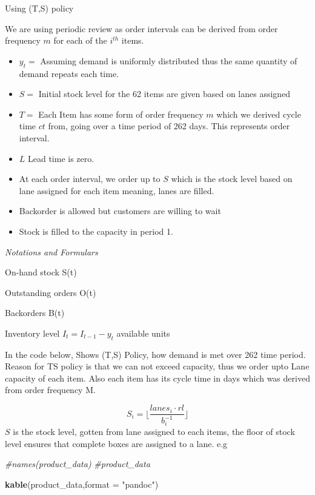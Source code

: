 \documentclass[
]{article}
\newenvironment{Shaded}{\begin{snugshade}}{\end{snugshade}}
\newcommand{\CommentTok}[1]{\textcolor[rgb]{0.56,0.35,0.01}{\textit{#1}}}
\newcommand{\DataTypeTok}[1]{\textcolor[rgb]{0.13,0.29,0.53}{#1}}
\newcommand{\KeywordTok}[1]{\textcolor[rgb]{0.13,0.29,0.53}{\textbf{#1}}}
\newcommand{\NormalTok}[1]{#1}
\newcommand{\StringTok}[1]{\textcolor[rgb]{0.31,0.60,0.02}{#1}}
\begin{document}
Using (T,S) policy

We are using periodic review as order intervals can be derived from
order frequency \(m\) for each of the \(i^{th}\) items.

\begin{itemize}
\item
  \(y_t=\) Assuming demand is uniformly distributed thus the same
  quantity of demand repeats each time.
\item
  \(S=\) Initial stock level for the 62 items are given based on lanes
  assigned
\item
  \(T=\) Each Item has some form of order frequency \(m\) which we
  derived cycle time \(ct\) from, going over a time period of 262 days.
  This represents order interval.
\item
  \(L\) Lead time is zero.
\item
  At each order interval, we order up to \(S\) which is the stock level
  based on lane assigned for each item meaning, lanes are filled.
\item
  Backorder is allowed but customers are willing to wait
\item
  Stock is filled to the capacity in period 1.
\end{itemize}

\emph{Notations and Formulars}

On-hand stock S(t)

Outstanding orders O(t)

Backorders B(t)

Inventory level \(I_t= I_{t-1}-y_t\) available units

In the code below, Shows (T,S) Policy, how demand is met over 262 time
period. Reason for TS policy is that we can not exceed capacity, thus we
order upto Lane capacity of each item. Also each item has its cycle time
in days which was derived from order frequency M.

\[S_i=\bigg \lfloor \frac {lanes_i \cdot rl}{b_i^{-1}} \bigg \rfloor \]
\(S\) is the stock level, gotten from lane assigned to each items, the
floor of stock level ensures that complete boxes are assigned to a lane.
e.g

\begin{Shaded}
\begin{Highlighting}[]
\CommentTok{#names(product_data)}
\CommentTok{#product_data}

\KeywordTok{kable}\NormalTok{(product_data,}\DataTypeTok{format =} \StringTok{"pandoc"}\NormalTok{)}
\end{Highlighting}
\end{Shaded}
\end{document}
